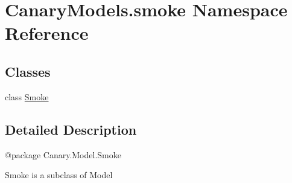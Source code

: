 \hypertarget{namespace_canary_models_1_1smoke}{\section{Canary\-Models.\-smoke Namespace Reference}
\label{namespace_canary_models_1_1smoke}
}
\subsection*{Classes}
\begin{DoxyCompactItemize}
\item 
class \hyperlink{class_canary_models_1_1smoke_1_1_smoke}{Smoke}
\end{DoxyCompactItemize}


\subsection{Detailed Description}
\begin{DoxyVerb}@package Canary.Model.Smoke

Smoke is a subclass of Model
\end{DoxyVerb}
 
